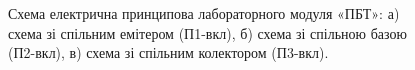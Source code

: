 \documentclass[a4paper,14pt]{extreport}
\begin{document}
\begin{figure}[h]
\label{ris5}
\caption{Схема електрична принципова лабораторного модуля «ПБТ»:
а) схема зі спільним емітером (П1-вкл), б) схема зі спільною базою
(П2-вкл), в) схема зі спільним колектором (П3-вкл).}
\end{figure}
\end{document}
